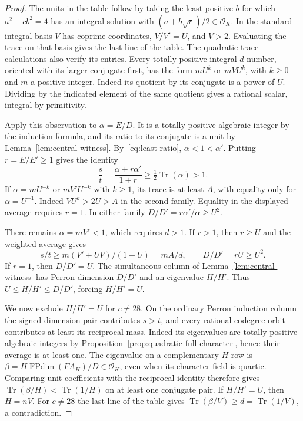 \documentclass[11pt,reqno]{amsart}
\newcommand{\codecheck}[2]{\href{https://github.com/sebastienpalcoux/grothendieck-ring-classification/blob/d5750105bb5758f3ad38d2e5464dfcc12c019816/supplements/rank6/sphericality/#1}{#2}}
\theoremstyle{remark}\newtheorem{remark}[theorem]{Remark}
\numberwithin{equation}{section}
\begin{document}
\begin{proof}
The units in the table follow by taking the least positive $b$ for
which $a^2-cb^2=4$ has an integral solution with
$(a+b\sqrt c)/2\in\mathcal O_K$. In the standard integral basis $V$ has
coprime coordinates, $V/V'=U$, and $V>2$. Evaluating the trace
on that basis gives the last line of the table. The
\codecheck{quadratic_trace_bounds.py}{quadratic trace calculations}
also verify its entries. Every totally positive
integral $d$-number, oriented with its larger conjugate first, has the
form $mU^k$ or $mVU^k$, with $k\ge0$ and $m$ a positive integer.
Indeed its quotient by its conjugate is a power of $U$. Dividing by
the indicated element of the same quotient gives a rational scalar,
integral by primitivity.

Apply this observation to $\alpha=E/D$. It is a totally positive
algebraic integer by the induction formula, and its ratio to its
conjugate is a unit by Lemma~\ref{lem:central-witness}.
By~\eqref{eq:least-ratio}, $\alpha<1<\alpha'$.
Putting $r=E/E'\ge1$ gives the identity
\[
 \frac{s}{t}=\frac{\alpha+r\alpha'}{1+r}
       \ge\tfrac12\operatorname{Tr}(\alpha)>1 .
\]
If $\alpha=mU^{-k}$ or $mV'U^{-k}$ with $k\ge1$, its trace is at
least $A$, with equality only for $\alpha=U^{-1}$. Indeed
$VU^k>2U>A$ in the second family. Equality in the displayed
average requires $r=1$. In either family $D/D'=r\alpha'/\alpha\ge U^2$.

There remains $\alpha=mV'<1$, which requires $d>1$.
If $r>1$, then $r\ge U$ and the weighted average gives
\[
    s/t\ge m(V'+UV)/(1+U)=mA/d,\qquad D/D'=rU\ge U^2 .
\]
If $r=1$, then $D/D'=U$. The simultaneous column of
Lemma~\ref{lem:central-witness} has Perron dimension $D/D'$ and
an eigenvalue $H/H'$. Thus $U\le H/H'\le D/D'$, forcing $H/H'=U$.

We now exclude $H/H'=U$ for $c\ne28$. On the ordinary Perron induction
column the signed dimension pair contributes $s>t$, and every
rational-codegree orbit contributes at least its reciprocal mass.
Indeed its eigenvalues are totally positive algebraic integers by
Proposition~\ref{prop:quadratic-full-character}, hence their average
is at least one. The eigenvalue on a complementary $H$-row is
$\beta=H\operatorname{FPdim}(FA_H)/D\in\mathcal O_K$, even when
its character field is quartic. Comparing unit coefficients with the
reciprocal identity therefore gives
$\operatorname{Tr}(\beta/H)<\operatorname{Tr}(1/H)$ on at least one
conjugate pair.
If $H/H'=U$, then $H=nV$. For $c\ne28$ the last line of the table
gives $\operatorname{Tr}(\beta/V)\ge d=\operatorname{Tr}(1/V)$,
a contradiction.
\end{proof}
\end{document}
